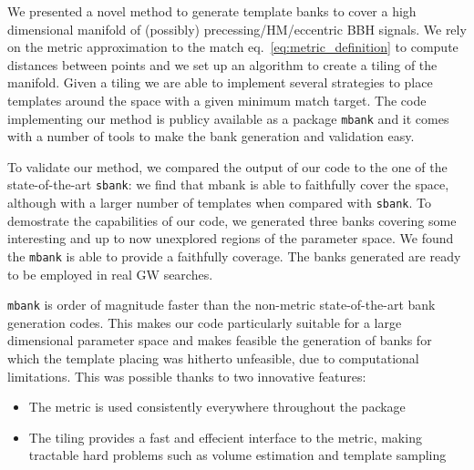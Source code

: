 \documentclass[twocolumn,showpacs,preprintnumbers,nofootinbib,prd,
superscriptaddress,10pt]{revtex4-2}
\newcommand{\stefano}[1]{{\textcolor{blue}{\texttt{SS: #1}} }}
\begin{document}

We presented a novel method to generate template banks to cover a high dimensional manifold of (possibly) precessing/HM/eccentric BBH signals.
We rely on the metric approximation to the match eq.~\eqref{eq:metric_definition} to compute distances between points and we set up an algorithm to create a tiling of the manifold. Given a tiling we are able to implement several strategies to place templates around the space with a given minimum match target.
The code implementing our method is publicy available as a package \texttt{mbank} and it comes with a number of tools to make the bank generation and validation easy.

To validate our method, we compared the output of our code to the one of the state-of-the-art \texttt{sbank}: we find that mbank is able to faithfully cover the space, although with a larger number of templates when compared with \texttt{sbank}.
To demostrate the capabilities of our code, we generated three banks covering some interesting and up to now unexplored regions of the parameter space. We found the \texttt{mbank} is able to provide a faithfully coverage.
The banks generated are ready to be employed in real GW searches.

\texttt{mbank} is order of magnitude faster than the non-metric state-of-the-art bank generation codes. This makes our code particularly suitable for a large dimensional parameter space and makes feasible the generation of banks for which the template placing was hitherto unfeasible, due to computational limitations.
This was possible thanks to two innovative features:
\begin{itemize}
	\item The metric is used consistently everywhere throughout the package
	\item The tiling provides a fast and effecient interface to the metric, making tractable hard problems such as volume estimation and template sampling
\end{itemize}
\end{document}
